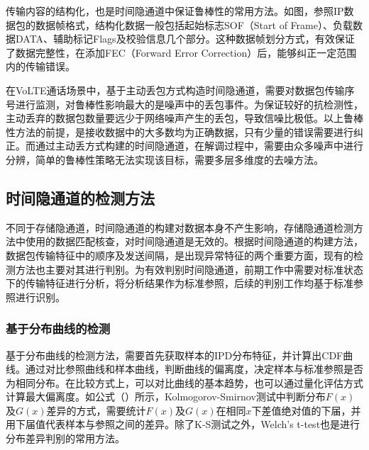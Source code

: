 传输内容的结构化，也是时间隐通道中保证鲁棒性的常用方法。如图，参照IP数据包的数据帧格式，结构化数据一般包括起始标志SOF（Start of Frame）、负载数据DATA、辅助标记Flags及校验信息几个部分。这种数据帧划分方式，有效保证了数据完整性，在添加FEC（Forward Error Correction）后，能够纠正一定范围内的传输错误。

在VoLTE通话场景中，基于主动丢包方式构造时间隐通道，需要对数据包传输序号进行监测，对鲁棒性影响最大的是噪声中的丢包事件。为保证较好的抗检测性，主动丢弃的数据包数量要远少于网络噪声产生的丢包，导致信噪比极低。以上鲁棒性方法的前提，是接收数据中的大多数均为正确数据，只有少量的错误需要进行纠正。而通过主动丢方式构建的时间隐通道，在解调过程中，需要由众多噪声中进行分辨，简单的鲁棒性策略无法实现该目标，需要多层多维度的去噪方法。

\subsection{时间隐通道的检测方法}
\label{sec:intro:background:detect}

不同于存储隐通道，时间隐通道的构建对数据本身不产生影响，存储隐通道检测方法中使用的数据匹配核查，对时间隐通道是无效的。根据时间隐通道的构建方法，数据包传输特征中的顺序及发送间隔，是出现异常特征的两个重要方面，现有的检测方法也主要对其进行判别。为有效判别时间隐通道，前期工作中需要对标准状态下的传输特征进行分析，将分析结果作为标准参照，后续的判别工作均基于标准参照进行识别。

\subsubsection{基于分布曲线的检测}
基于分布曲线的检测方法，需要首先获取样本的IPD分布特征，并计算出CDF曲线。通过对比参照曲线和样本曲线，判断曲线的偏离度，决定样本与标准参照是否为相同分布。在比较方式上，可以对比曲线的基本趋势，也可以通过量化评估方式计算最大偏离度。如公式（）所示，Kolmogorov-Smirnov测试中判断分布$F(x)$及$G(x)$差异的方式，需要统计$F(x)$及$G(x)$在相同$x$下差值绝对值的下届，并用下届值代表样本与参照之间的差异。除了K-S测试之外，Welch’s t-test也是进行分布差异判别的常用方法。


